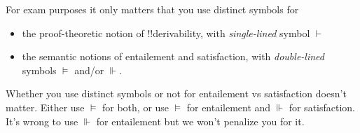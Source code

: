 \documentclass[../../../../include/open-logic-section]{subfiles}
\begin{document}
For exam purposes it only matters that you use distinct symbols for
\begin{itemize}
    \item the proof-theoretic notion of !!{derivability}, with \emph{single-lined} symbol
        $\vdash$
    \item the semantic notions of entailement and satisfaction, with \emph{double-lined}
        symbols $\vDash$ and/or $\Vdash$. 
\end{itemize}
Whether you use distinct symbols or not for entailement vs satisfaction
doesn't matter. Either use $\vDash$ for both,
or use $\vDash$ for entailement and $\Vdash$ for satisfaction. It's 
wrong to use $\Vdash$ for entailement but we won't penalize you for it.
\end{document}
